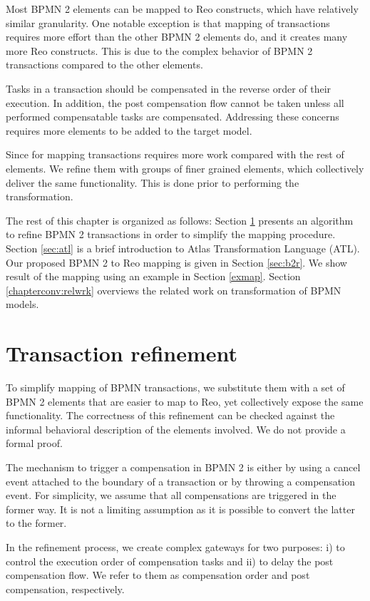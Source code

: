 Most BPMN 2 elements can be mapped to Reo constructs, which have relatively similar granularity. One notable exception is that mapping of transactions requires more effort than the other BPMN 2 elements do, and it creates many more Reo constructs. 
This is due to the complex behavior of BPMN 2 transactions compared to the other elements. 

Tasks in a transaction should be compensated in the reverse order of their execution. In addition, the post compensation flow cannot be taken unless all performed compensatable tasks are compensated. Addressing these concerns requires more elements to be added to the target model.
 
Since for mapping transactions requires more work compared with the rest of elements. We refine them with groups of finer grained elements, which collectively deliver the same functionality. This is done prior to performing the transformation.

The rest of this chapter is organized as follows: Section \ref{sec:refine} presents an algorithm to refine BPMN 2 transactions in order to simplify the mapping procedure. Section \ref{sec:atl} is a brief introduction to Atlas Transformation Language (ATL). Our proposed BPMN 2 to Reo mapping is given in Section \ref{sec:b2r}. We show result of the mapping using an example in Section \ref{exmap}. Section \ref{chapterconv:relwrk} overviews the related work on transformation of BPMN models. 

\section{Transaction refinement}
\label{sec:refine}
To simplify mapping of BPMN transactions, we substitute them with a set of BPMN 2 elements that are easier to map to Reo, yet collectively expose the same functionality. %
The correctness of this refinement can be checked against the informal behavioral description of the elements involved. We do not provide a formal proof. 

The mechanism to trigger a compensation in BPMN 2 is either by using a cancel event attached to the boundary of a transaction  or by throwing a compensation event.   
For simplicity, we assume that all compensations are triggered in the former way. It is not a limiting assumption as it is possible to convert the latter to the former. 

In the refinement process, we create complex gateways for two purposes: i) to control the execution order of compensation tasks and ii) to delay the post compensation flow. We refer to them as {compensation order} and {post compensation}, respectively. 

